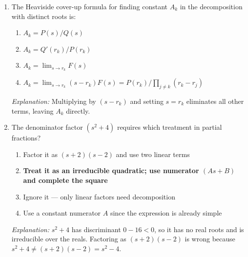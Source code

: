 \documentclass[12pt,a4paper]{article}
\begin{document}
\begin{enumerate}[label=\textbf{\arabic*.}, leftmargin=*, itemsep=1.2em]
\item The Heaviside cover-up formula for finding constant $A_k$ in the
  decomposition with distinct roots is:
  \begin{enumerate}[label=(\alph*)]
    \item $A_k = P(s)/Q(s)$
    \item $A_k = Q'(r_k)/P(r_k)$
    \item $A_k = \lim_{s\to r_k}F(s)$
    \item \textbf{$A_k = \lim_{s\to r_k}(s-r_k)F(s) = P(r_k)/\prod_{j\neq k}(r_k-r_j)$}
  \end{enumerate}
  \textit{Explanation:} Multiplying by $(s-r_k)$ and setting $s=r_k$
  eliminates all other terms, leaving $A_k$ directly.

\item The denominator factor $(s^2+4)$ requires which treatment in partial
  fractions?
  \begin{enumerate}[label=(\alph*)]
    \item Factor it as $(s+2)(s-2)$ and use two linear terms
    \item \textbf{Treat it as an irreducible quadratic; use numerator $(As+B)$
      and complete the square}
    \item Ignore it --- only linear factors need decomposition
    \item Use a constant numerator $A$ since the expression is already simple
  \end{enumerate}
  \textit{Explanation:} $s^2+4$ has discriminant $0-16<0$, so it has no
  real roots and is irreducible over the reals. Factoring as $(s+2)(s-2)$
  is wrong because $s^2+4\neq (s+2)(s-2)=s^2-4$.

\end{enumerate}

\end{document}
